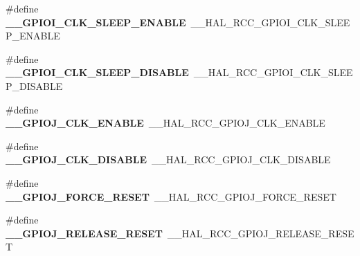 \begin{DoxyCompactItemize}
\item 
\hypertarget{group___h_a_l___r_c_c___aliased_ga21fb63ab15ee9924ef806396fb0d8040}{\#define {\bfseries \-\_\-\-\_\-\-G\-P\-I\-O\-I\-\_\-\-C\-L\-K\-\_\-\-S\-L\-E\-E\-P\-\_\-\-E\-N\-A\-B\-L\-E}~\-\_\-\-\_\-\-H\-A\-L\-\_\-\-R\-C\-C\-\_\-\-G\-P\-I\-O\-I\-\_\-\-C\-L\-K\-\_\-\-S\-L\-E\-E\-P\-\_\-\-E\-N\-A\-B\-L\-E}\label{group___h_a_l___r_c_c___aliased_ga21fb63ab15ee9924ef806396fb0d8040}

\item 
\hypertarget{group___h_a_l___r_c_c___aliased_gabdcc722303d0c5cc8025cd0654f4352a}{\#define {\bfseries \-\_\-\-\_\-\-G\-P\-I\-O\-I\-\_\-\-C\-L\-K\-\_\-\-S\-L\-E\-E\-P\-\_\-\-D\-I\-S\-A\-B\-L\-E}~\-\_\-\-\_\-\-H\-A\-L\-\_\-\-R\-C\-C\-\_\-\-G\-P\-I\-O\-I\-\_\-\-C\-L\-K\-\_\-\-S\-L\-E\-E\-P\-\_\-\-D\-I\-S\-A\-B\-L\-E}\label{group___h_a_l___r_c_c___aliased_gabdcc722303d0c5cc8025cd0654f4352a}

\item 
\hypertarget{group___h_a_l___r_c_c___aliased_ga9306d046c939c0d6afb3e8bb48b69974}{\#define {\bfseries \-\_\-\-\_\-\-G\-P\-I\-O\-J\-\_\-\-C\-L\-K\-\_\-\-E\-N\-A\-B\-L\-E}~\-\_\-\-\_\-\-H\-A\-L\-\_\-\-R\-C\-C\-\_\-\-G\-P\-I\-O\-J\-\_\-\-C\-L\-K\-\_\-\-E\-N\-A\-B\-L\-E}\label{group___h_a_l___r_c_c___aliased_ga9306d046c939c0d6afb3e8bb48b69974}

\item 
\hypertarget{group___h_a_l___r_c_c___aliased_ga7b65a354e89d6f3b0ca137395f3851bb}{\#define {\bfseries \-\_\-\-\_\-\-G\-P\-I\-O\-J\-\_\-\-C\-L\-K\-\_\-\-D\-I\-S\-A\-B\-L\-E}~\-\_\-\-\_\-\-H\-A\-L\-\_\-\-R\-C\-C\-\_\-\-G\-P\-I\-O\-J\-\_\-\-C\-L\-K\-\_\-\-D\-I\-S\-A\-B\-L\-E}\label{group___h_a_l___r_c_c___aliased_ga7b65a354e89d6f3b0ca137395f3851bb}

\item 
\hypertarget{group___h_a_l___r_c_c___aliased_gacd1de4b6619359a03c6fe6cca751f054}{\#define {\bfseries \-\_\-\-\_\-\-G\-P\-I\-O\-J\-\_\-\-F\-O\-R\-C\-E\-\_\-\-R\-E\-S\-E\-T}~\-\_\-\-\_\-\-H\-A\-L\-\_\-\-R\-C\-C\-\_\-\-G\-P\-I\-O\-J\-\_\-\-F\-O\-R\-C\-E\-\_\-\-R\-E\-S\-E\-T}\label{group___h_a_l___r_c_c___aliased_gacd1de4b6619359a03c6fe6cca751f054}

\item 
\hypertarget{group___h_a_l___r_c_c___aliased_ga352651a646a83613b70dd39b81e7d81e}{\#define {\bfseries \-\_\-\-\_\-\-G\-P\-I\-O\-J\-\_\-\-R\-E\-L\-E\-A\-S\-E\-\_\-\-R\-E\-S\-E\-T}~\-\_\-\-\_\-\-H\-A\-L\-\_\-\-R\-C\-C\-\_\-\-G\-P\-I\-O\-J\-\_\-\-R\-E\-L\-E\-A\-S\-E\-\_\-\-R\-E\-S\-E\-T}\label{group___h_a_l___r_c_c___aliased_ga352651a646a83613b70dd39b81e7d81e}


\end{DoxyCompactItemize}
